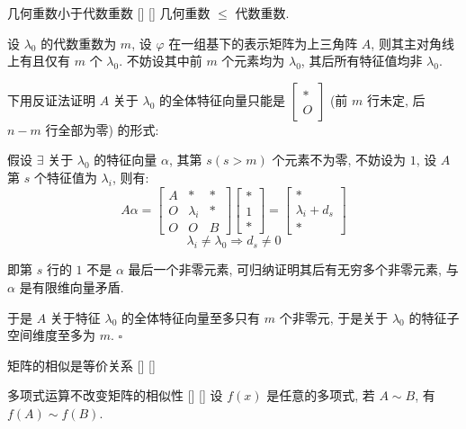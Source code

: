 \documentclass[UTF8]{ctexart}
\DeclareMathOperator{\0}{\mathbf{0}}
\DeclareMathOperator{\<}{\langle}
\renewcommand{\>}{\rangle}
\begin{document}
		\begin{ppt}
			[]
			{几何重数小于代数重数}
			[]
			[]
			几何重数 \(\leq\) 代数重数. 
		\end{ppt}

		\begin{prf}
			设 \(\lambda_0\) 的代数重数为 \(m\), 设 \(\varphi\) 在一组基下的表示矩阵为上三角阵 \(A\), 则其主对角线上有且仅有 \(m\) 个 \(\lambda_0\). 不妨设其中前 \(m\) 个元素均为 \(\lambda_0\), 其后所有特征值均非 \(\lambda_0\). 

			下用反证法证明 \(A\) 关于 \(\lambda_0\) 的全体特征向量只能是
			 \(\begin{bmatrix}
				* \\ O
			\end{bmatrix}\) (前 \(m\) 行未定, 后 \(n-m\) 行全部为零)
			的形式: 

			假设 \(\exists\) 关于 \(\lambda_0\) 的特征向量 \(\alpha\), 其第 \(s(s>m)\) 个元素不为零, 不妨设为 \(1\), 设 \(A\) 第 \(s\) 个特征值为 \(\lambda_i\), 则有: 
			\[A\alpha=
			\begin{bmatrix}
				A & * & * \\
				O & \lambda_i & * \\
				O & O & B
			\end{bmatrix}
			\begin{bmatrix}
				* \\ 1 \\ *
			\end{bmatrix}=
			\begin{bmatrix}
				* \\ \lambda_i+d_s \\ *
			\end{bmatrix}\]
			\[\lambda_i\neq\lambda_0\Longrightarrow d_s\neq 0\]
			
			即第 \(s\) 行的 \(1\) 不是 \(\alpha\) 最后一个非零元素, 可归纳证明其后有无穷多个非零元素, 与 \(\alpha\) 是有限维向量矛盾. 

			于是 \(A\) 关于特征 \(\lambda_0\) 的全体特征向量至多只有 \(m\) 个非零元, 于是关于 \(\lambda_0\) 的特征子空间维度至多为 \(m\).  \(\square\) 
		
		\end{prf} 

		\begin{ppt}
			[]
			{矩阵的相似是等价关系}
			[]
			[]
		\end{ppt}

		\begin{ppt}
			[]
			{多项式运算不改变矩阵的相似性}
			[]
			[]
			设 \(f(x)\) 是任意的多项式, 若 \(A\sim B\), 有 \(f(A)\sim f(B)\).
		\end{ppt}
\end{document}
